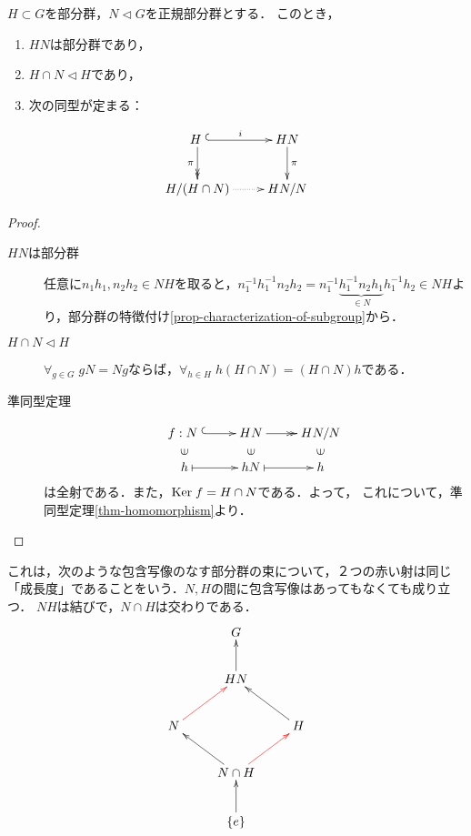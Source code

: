 \documentclass[uplatex,dvipdfmx]{jsreport}
\begin{document}
\begin{corollary}[第二同型定理]\label{cor-isomorphism-2}
    $H\subset G$を部分群，$N\triangleleft G$を正規部分群とする．
    このとき，
    \begin{enumerate}
        \item $HN$は部分群であり，
        \item $H\cap N\triangleleft H$であり，
        \item 次の同型が定まる：
    \end{enumerate}
    \[\xymatrix{
        H\;\ar@{^{(}->}[r]^-{i}\ar@{->>}[d]_-{\pi}&HN\ar[d]^-\pi\\
        H/(H\cap N)\ar@{.>}[r]&HN/N
    }\]
\end{corollary}
\begin{proof}\mbox{}
    \begin{description}
        \item[$HN$は部分群] 任意に$n_1h_1,n_2h_2\in NH$を取ると，$n_1^{-1}h_1^{-1}n_2h_2=n_1^{-1}\underbrace{h_1^{-1}n_2h_1}_{\in N}h_1^{-1}h_2\in NH$より，部分群の特徴付け\ref{prop-characterization-of-subgroup}から．
        \item[$H\cap N\triangleleft H$] $\forall_{g\in G}\; gN=Ng$ならば，$\forall_{h\in H}\;h(H\cap N)=(H\cap N)h$である．
        \item[準同型定理] \[\xymatrix@R-2pc{
            f:N\;\ar@{^{(}->}[r]&HN\ar@{->>}[r]&HN/N\\
            \rotatebox[origin=c]{90}{$\in$}&\rotatebox[origin=c]{90}{$\in$}&\rotatebox[origin=c]{90}{$\in$}\\
            h\ar@{|->}[r]&hN\ar@{|->}[r]&h
        }\]
        は全射である．また，$\mathrm{Ker}\; f=H\cap N$である．よって，
        これについて，準同型定理\ref{thm-homomorphism}より．
    \end{description}
\end{proof}
\begin{remarks}
    これは，次のような包含写像のなす部分群の束について，２つの赤い射は同じ「成長度」であることをいう．$N,H$の間に包含写像はあってもなくても成り立つ．
    $NH$は結びで，$N\cap H$は交わりである．
    \[\xymatrix{
        &G\\
        &HN\ar[u]\\
        N\ar@[red][ur]&&H\ar[ul]\\
        &N\cap H\ar[ul]\ar@[red][ur]\\
        &\{e\}\ar[u]
    }\]
\end{remarks}
\end{document}
